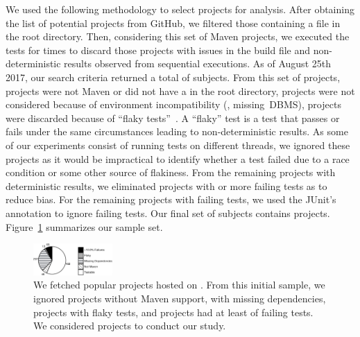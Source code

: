 We used the following methodology to select projects for
analysis. After obtaining the list of potential projects from GitHub, we filtered those
containing a \pomf{} file in the root directory.
Then, considering this set of Maven projects, we
executed the tests for \SubjectsReruns{} times to discard those projects with
issues
in the build file and non-deterministic results observed from sequential executions.
As of August 25th 2017, our search criteria returned a total of \SubjectsGithub{}
subjects.
From this set of projects,
\SubjectsGithubNotMaven{} projects were not Maven or did not have a
\pomf{} in the root directory, 
\SubjectsGithubNotTestable{} projects were not considered because of
environment incompatibility
(\eg, missing~DBMS),
\SubjectsGithubFlaky{} projects were discarded because of
``flaky tests''~\cite{luo-etal-fse2014}. A ``flaky'' test is a test that passes or fails under
the same circumstances leading to non-deterministic results.
As some of our experiments consist of running tests on different
threads, we ignored these projects as it would be impractical
to identify whether a test failed due to a race condition or some
other source of flakiness.
From the remaining \SubjectsGithubConsistant{} projects with
deterministic results, we eliminated \SubjectsGithubTooManyFailures{}
projects with \SuiteFailingThreshold{} or more failing tests as to
reduce bias. For the
remaining projects with failing tests, we used the JUnit's
 annotation to ignore failing tests.
Our final set of subjects contains \numSubjs{} projects.
Figure~\ref{fig:subjects} summarizes our sample set.

\begin{figure}[ht]
  \centering
  \includegraphics[width=0.27\textwidth]{results/piechart-subjs.pdf}
  \caption{\label{fig:subjects}We fetched \SubjectsGithub{} popular projects
  hosted on \github{}. From this initial sample, we ignored
  \SubjectsGithubNotMaven{} projects without Maven support,
  \SubjectsGithubNotTestable{} with missing dependencies,
  \SubjectsGithubFlaky{} projects with flaky tests, and
  \SubjectsGithubTooManyFailures{} projects had at least
  \SuiteFailingThreshold{} of failing tests. We considered
  \numSubjs{} projects to conduct our study.}
  \vspace{-1ex}
\end{figure}

